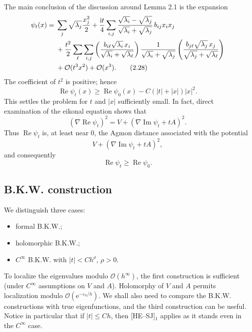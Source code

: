 \documentclass[11pt]{article}
\newcommand{\Ree}{\operatorname{Re}}
\newcommand{\Imm}{\operatorname{Im}}
\newcommand{\OO}{\mathcal O}
\newcommand{\ii}{\mathrm{i}}
\newcommand{\e}{\mathrm{e}}
\begin{document}
The main conclusion of the discussion around Lemma 2.1 is the expansion
\begin{align}
\psi_t(x)
={}&\sum_j\sqrt{\lambda_j}\frac{x_j^2}{2}
+\frac{\ii t}{4}\sum_{i,j}
\frac{\sqrt{\lambda_i}-\sqrt{\lambda_j}}
{\sqrt{\lambda_i}+\sqrt{\lambda_j}}\,b_{ij}x_ix_j
\notag\\
&+\frac{t^2}{2}\sum_{\ell}\sum_{i,j}
\left(\frac{b_{i\ell}\sqrt{\lambda_i}\,x_i}{\sqrt{\lambda_i}+\sqrt{\lambda_\ell}}\right)
\frac{1}{\sqrt{\lambda_i}+\sqrt{\lambda_j}}
\left(\frac{b_{j\ell}\sqrt{\lambda_j}\,x_j}{\sqrt{\lambda_j}+\sqrt{\lambda_\ell}}\right)
\notag\\
&+\OO(t^3x^2)+\OO(x^3).
\tag{2.28}
\end{align}
The coefficient of $t^2$ is positive; hence
\begin{equation}
\Ree\psi_t(x)\ge \Ree\psi_0(x)-C(|t|+|x|)|x|^2.
\tag{2.29}
\end{equation}
This settles the problem for $t$ and $|x|$ sufficiently small. In fact, direct examination of the eikonal equation shows that
\begin{equation}
(\nabla\Ree\psi_t)^2
=V+(\nabla\Imm\psi_t+tA)^2.
\tag{2.30}
\end{equation}
Thus $\Ree\psi_t$ is, at least near $0$, the Agmon distance associated with the potential
\[
V+(\nabla\Imm\psi_t+tA)^2,
\]
and consequently
\begin{equation}
\Ree\psi_t\ge\Ree\psi_0.
\tag{2.31}
\end{equation}

\subsection*{B.K.W. construction}

We distinguish three cases:
\begin{itemize}[leftmargin=2em]
\item formal B.K.W.;
\item holomorphic B.K.W.;
\item $C^\infty$ B.K.W. with $|t|<Ch^\rho$, $\rho>0$.
\end{itemize}
To localize the eigenvalues modulo $\OO(h^\infty)$, the first construction is sufficient (under $C^\infty$ assumptions on $V$ and $A$). Holomorphy of $V$ and $A$ permits localization modulo $\OO(\e^{-\varepsilon_0/h})$. We shall also need to compare the B.K.W. constructions with true eigenfunctions, and the third construction can be useful. Notice in particular that if $|t|\le Ch$, then [HE--SJ]$_1$ applies as it stands even in the $C^\infty$ case.
\end{document}
